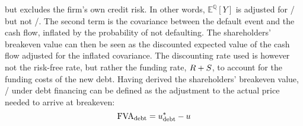 \documentclass[main.tex]{subfiles}
\begin{document}
            but excludes the firm's own credit risk. 
            In other words, $\mathbb{E}^{\mathbb{Q}}\left[Y\right]$ is adjusted for \CVA/ but not \DVA/.
            The second term is the covariance between the default event and the cash flow,
            inflated by the probability of not defaulting. 
            The shareholders' breakeven value can then be seen as the discounted expected value of the cash flow
            adjusted for the inflated covariance.
            The discounting rate used is however not the risk-free rate, 
            but rather the funding rate, $R+S$, 
            to account for the funding costs of the new debt.
            Having derived the shareholders' breakeven value, \FVA/ under debt financing
            can be defined as the adjustment to the actual price needed to arrive at breakeven:
                \begin{equation}
                    \FVA/_{\text{debt}} 
                        = u^{\ast}_{\text{debt}} - u
                    \label{eqn:fva-debt-financing}
                \end{equation}
\end{document}
